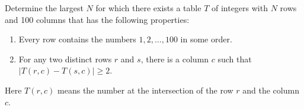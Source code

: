 Determine the largest $N$ for which there exists a table $T$ of integers with $N$ rows and 100 columns that has the following properties:

\begin{enumerate}
\item[(i)] Every row contains the numbers $1, 2, \ldots, 100$ in some order.
\item[(ii)] For any two distinct rows $r$ and $s$, there is a column $c$ such that $|T(r, c) - T(s, c)| \geq 2$.
\end{enumerate}

Here $T(r, c)$ means the number at the intersection of the row $r$ and the column $c$.
